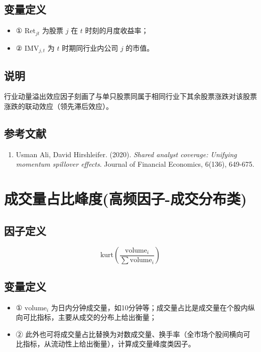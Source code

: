 \documentclass{article}
\begin{document}
\subsection{变量定义}
\begin{itemize}
    \item ① \(\mathrm{Ret}_{jt}\) 为股票 \(j\) 在 \(t\) 时刻的月度收益率；
    \item ② \(\mathrm{IMV}_{j,t}\) 为 \(t\) 时期同行业内公司 \(j\) 的市值。
\end{itemize}

\subsection{说明}
行业动量溢出效应因子刻画了与单只股票同属于相同行业下其余股票涨跌对该股票涨跌的联动效应（领先滞后效应）。

\subsection{参考文献}
\begin{enumerate}
    \item Usman Ali, David Hirshleifer. (2020). \textit{Shared analyst coverage: Unifying momentum spillover effects}. Journal of Financial Economics, 6(136), 649-675.
\end{enumerate}

\section{成交量占比峰度(高频因子-成交分布类)}

\subsection{因子定义}

\begin{equation}
    \mathrm{kurt}\left( \frac{\mathrm{volume}_i}{\sum \mathrm{volume}_i} \right)
\end{equation}

\subsection{变量定义}
\begin{itemize}
    \item ① \(\mathrm{volume}_i\) 为日内分钟成交量，如10分钟等；成交量占比是成交量在个股内纵向可比指标，主要从成交的分布上给出衡量；
    \item ② 此外也可将成交量占比替换为对数成交量、换手率（全市场个股间横向可比指标，从流动性上给出衡量），计算成交量峰度类因子。
\end{itemize}
\end{document}
